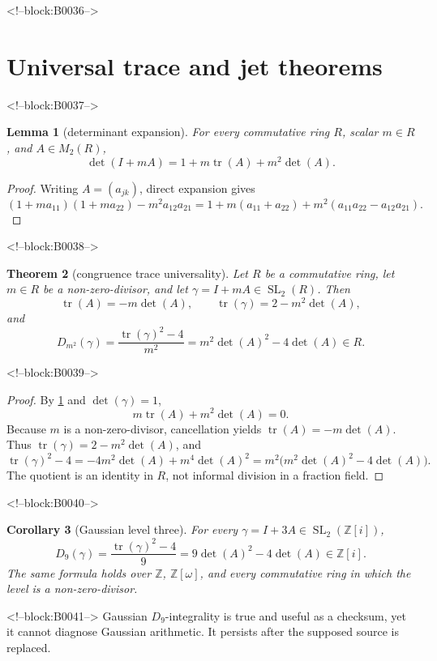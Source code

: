 \documentclass[11pt,a4paper]{article}
\newtheorem{theorem}{Theorem}[section]
\newtheorem{lemma}[theorem]{Lemma}
\newtheorem{corollary}[theorem]{Corollary}
\theoremstyle{definition}
\theoremstyle{remark}
\newcommand{\SL}{\operatorname{SL}}
\newcommand{\tr}{\operatorname{tr}}
\newcommand{\Gauss}{\mathbb{Z}[i]}
\newcommand{\Eis}{\mathbb{Z}[\omega]}
\begin{document}
<!--block:B0036-->
\section{Universal trace and jet theorems}\label{sec:theorems}

<!--block:B0037-->
\begin{lemma}[determinant expansion]\label{lem:detexp}
For every commutative ring \(R\), scalar \(m\in R\), and \(A\in M_2(R)\),
\[
 \det(I+mA)=1+m\tr(A)+m^2\det(A).
\]
\end{lemma}
\begin{proof}
Writing \(A=(a_{jk})\), direct expansion gives
\[
 (1+ma_{11})(1+ma_{22})-m^2a_{12}a_{21}
 =1+m(a_{11}+a_{22})+m^2(a_{11}a_{22}-a_{12}a_{21}).
\]
\end{proof}

<!--block:B0038-->
\begin{theorem}[congruence trace universality]\label{thm:universal}
Let \(R\) be a commutative ring, let \(m\in R\) be a non-zero-divisor, and let \(\gamma=I+mA\in\SL_2(R)\). Then
\[
 \tr(A)=-m\det(A),\qquad \tr(\gamma)=2-m^2\det(A),
\]
and
\begin{equation}\label{eq:universal}
 D_{m^2}(\gamma)=\frac{\tr(\gamma)^2-4}{m^2}
 =m^2\det(A)^2-4\det(A)\in R.
\end{equation}
\end{theorem}

<!--block:B0039-->
\begin{proof}
By \cref{lem:detexp} and \(\det(\gamma)=1\),
\[
 m\tr(A)+m^2\det(A)=0.
\]
Because \(m\) is a non-zero-divisor, cancellation yields \(\tr(A)=-m\det(A)\). Thus \(\tr(\gamma)=2-m^2\det(A)\), and
\[
 \tr(\gamma)^2-4
 =-4m^2\det(A)+m^4\det(A)^2
 =m^2\bigl(m^2\det(A)^2-4\det(A)\bigr).
\]
The quotient is an identity in \(R\), not informal division in a fraction field.
\end{proof}

<!--block:B0040-->
\begin{corollary}[Gaussian level three]\label{cor:d9}
For every \(\gamma=I+3A\in\SL_2(\Gauss)\),
\[
 D_9(\gamma)=\frac{\tr(\gamma)^2-4}{9}=9\det(A)^2-4\det(A)\in\Gauss.
\]
The same formula holds over \(\mathbb Z\), \(\Eis\), and every commutative ring in which the level is a non-zero-divisor.
\end{corollary}

<!--block:B0041-->
Gaussian \(D_9\)-integrality is true and useful as a checksum, yet it cannot diagnose Gaussian arithmetic. It persists after the supposed source is replaced.
\end{document}
